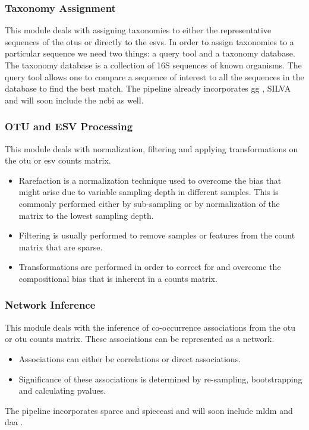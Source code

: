     \subsubsection*{Taxonomy Assignment}
      \vspace{-5mm}
      This module deals with assigning taxonomies to either the representative sequences of the \ac{otu}s or directly to the \ac{esv}s.
      In order to assign taxonomies to a particular sequence we need two things: a query tool and a taxonomy database.
      The taxonomy database is a collection of 16S sequences of known organisms.
      The query tool allows one to compare a sequence of interest to all the sequences in the database to find the best match.
      The pipeline already incorporates \ac{gg} \cite{DeSantis2006}, SILVA \cite{Quast2012} and will soon include the \ac{ncbi} \cite{Sayers2009} as well.

    \subsubsection*{OTU and ESV Processing}
      \vspace{-5mm}
      This module deals with normalization, filtering and applying transformations on the \ac{otu} or \ac{esv} counts matrix.
      \begin{itemize}
        \item Rarefaction is a normalization technique used to overcome the bias that might arise due to variable sampling depth in different samples. This is commonly performed either by sub-sampling or by normalization of the matrix to the lowest sampling depth.
        \item Filtering is usually performed to remove samples or features from the count matrix that are sparse.
        \item Transformations are performed in order to correct for and overcome the compositional bias that is inherent in a counts matrix.
      \end{itemize}

    \subsubsection*{Network Inference}
      \vspace{-5mm}
      This module deals with the inference of co-occurrence associations from the \ac{otu} or \ac{otu} counts matrix. These associations can be represented as a network.
      \begin{itemize}
        \item Associations can either be correlations or direct associations.
        \item Significance of these associations is determined by re-sampling, bootstrapping and calculating pvalues.
      \end{itemize}
      The pipeline incorporates \ac{sparcc} \cite{Friedman2012} and \ac{spieceasi} \cite{Kurtz2015} and will soon include \ac{mldm} \cite{Yang2017} and \ac{daa} \cite{Menon2018}.

